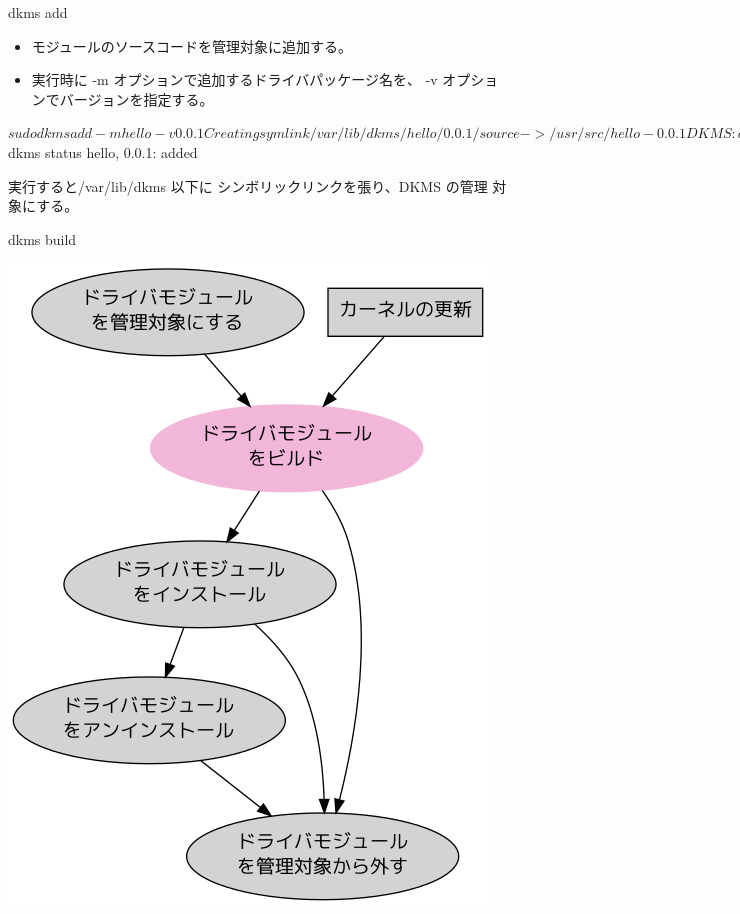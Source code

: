 \begin{frame}[containsverbatim]{dkms add}

\begin{itemize}
\item モジュールのソースコードを管理対象に追加する。
\item 実行時に -m オプションで追加するドライバパッケージ名を、
-v オプションでバージョンを指定する。
\end{itemize}

\begin{commandline}
$ sudo dkms add -m hello -v 0.0.1

Creating symlink /var/lib/dkms/hello/0.0.1/source ->
                 /usr/src/hello-0.0.1

DKMS: add completed.
$ dkms status
hello, 0.0.1: added
\end{commandline}

実行すると/var/lib/dkms 以下に シンボリックリンクを張り、DKMS の管理
対象にする。

\end{frame}


\begin{frame}{dkms build}

\begin{center}
  \includegraphics[width=0.5\hsize]{image201202/dkms0-build.png}
\end{center}

\end{frame}


